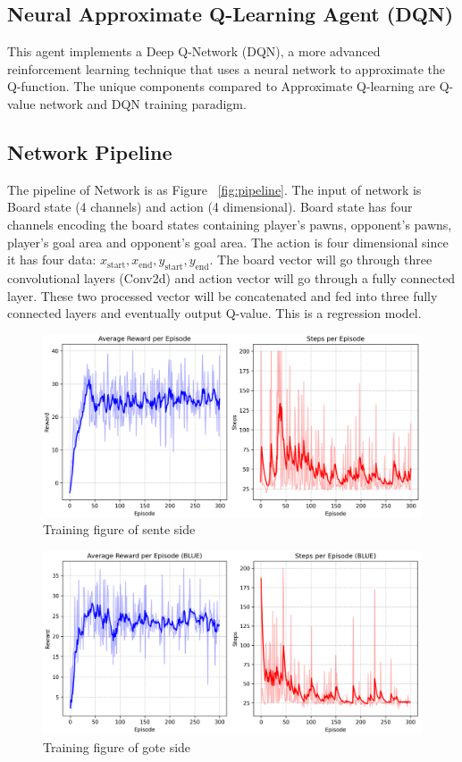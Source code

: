 \subsection{Neural Approximate Q-Learning Agent (DQN)}
This agent implements a Deep Q-Network (DQN), a more advanced reinforcement learning technique that uses a neural network to approximate the Q-function. The unique components compared to Approximate Q-learning are Q-value network and DQN training paradigm. 
\subsection{Network Pipeline}
The pipeline of Network is as Figure ~\ref{fig:pipeline}. The input of network is Board state (4 channels) and action (4 dimensional). Board state has four channels encoding the board states containing player's pawns, opponent's pawns, player's goal area and opponent's goal area. The action is four dimensional since it has four data: $x_{\text{start}}, x_{\text{end}}, y_{\text{start}}, y_{\text{end}}$. The board vector will go through three convolutional layers (Conv2d)\cite{DBLP:journals/corr/OSheaN15} and action vector will go through a fully connected layer. These two processed vector will be concatenated and fed into three fully connected layers and eventually output Q-value. This is a regression model. 
\begin{figure}[h]
    \centering
    \includegraphics[width=1\columnwidth]{figures/sente.png}
    \caption{Training figure of sente side}
    \label{fig:sente}
\end{figure}
\begin{figure}[h]
    \centering
    \includegraphics[width=1\columnwidth]{figures/gote.png}
    \caption{Training figure of gote side}
    \label{fig:gote}
\end{figure}
